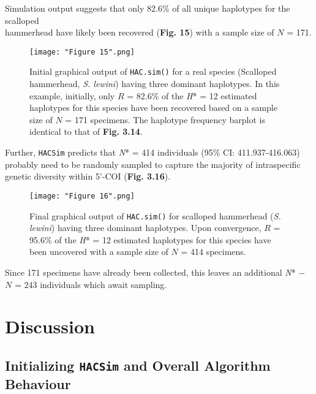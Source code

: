 \vspace{2mm}

Simulation output suggests that only 82.6\% of all unique haplotypes for the scalloped \\ hammerhead have likely been recovered (\textbf{Fig. 15}) with a sample size of $N$ = 171. 

\begin{figure}[H]

\centering

\texttt{[image: "Figure 15".png]}

\caption{Initial graphical output of {\tt HAC.sim()} for a real species (Scalloped hammerhead, \textit{S. lewini}) having three dominant haplotypes. In this example, initially, only $R$ = 82.6\% of the \textit{H}* = 12 estimated haplotypes for this species have been recovered based on a sample size of $N$ = 171 specimens. The haplotype frequency barplot is identical to that of \textbf{Fig. 3.14}.}

\end{figure}

\noindent Further, {\tt HACSim} predicts that \textit{N}* =  414 individuals (95\% CI: 411.937-416.063) probably need to be randomly sampled to capture the majority of intraspecific genetic diversity within 5'-COI (\textbf{Fig. 3.16}). 

\begin{figure}[H]

\centering

\texttt{[image: "Figure 16".png]}

\caption{Final graphical output of {\tt HAC.sim()} for scalloped hammerhead (\textit{S. lewini}) having three dominant haplotypes. Upon convergence, $R$ = 95.6\% of the \textit{H}* = 12 estimated haplotypes for this species have been uncovered with a sample size of $N$ = 414 specimens.}

\end{figure}


\noindent Since 171 specimens have already been collected, this leaves an additional \textit{N}* $-$ $N$ = 243 individuals which await sampling.


\section{Discussion}

\subsection{Initializing {\tt HACSim} and Overall Algorithm Behaviour}

